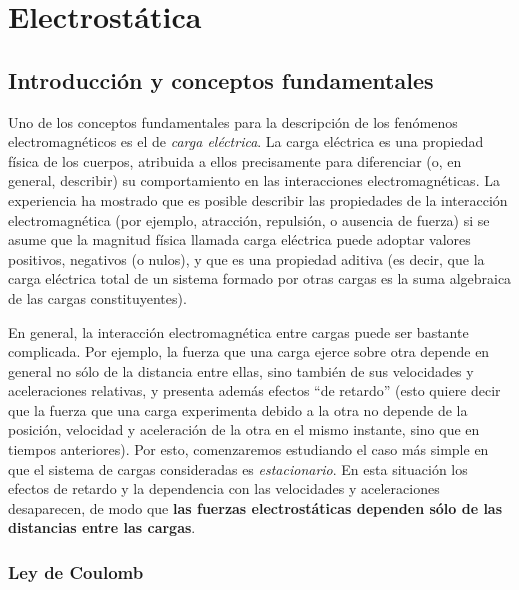 \chapter{Electrostática}
\setcounter{page}{1}

\section{Introducción y conceptos fundamentales}

Uno de los conceptos fundamentales para la descripción de los fenómenos electromagnéticos es el de \textit{carga eléctrica}. La carga eléctrica es una propiedad física de los cuerpos, atribuida a ellos precisamente para diferenciar (o, en general, describir) su comportamiento en las interacciones electromagnéticas. La experiencia ha mostrado que es posible describir las propiedades de la interacción electromagnética (por ejemplo, atracción, repulsión, o ausencia de fuerza) si se asume que la magnitud física llamada carga eléctrica puede adoptar valores positivos, negativos (o nulos), y que es una propiedad aditiva (es decir, que la carga eléctrica total de un sistema formado por otras cargas es la suma algebraica de las cargas constituyentes).

En general, la interacción electromagnética entre cargas puede ser bastante complicada. Por ejemplo, la fuerza que una carga ejerce sobre otra depende en general no sólo de la distancia entre ellas, sino también de sus velocidades y aceleraciones relativas, y presenta además efectos ``de retardo'' (esto quiere decir que la fuerza que una carga experimenta debido a la otra no depende de la posición, velocidad y aceleración de la otra en el mismo instante, sino que en tiempos anteriores). Por esto, comenzaremos estudiando el caso más simple en que el sistema de cargas consideradas es \textit{estacionario}. En esta situación los efectos de retardo y la dependencia con las velocidades y aceleraciones desaparecen, de modo que \textbf{las fuerzas electrostáticas dependen sólo de las distancias entre las cargas}.


\subsection{Ley de Coulomb}

